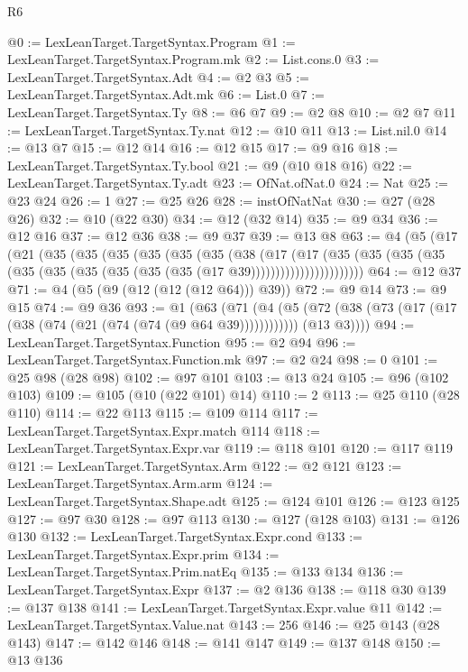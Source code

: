 \begin{lexlean}{R6}
\begin{coremodule}
@0 := LexLeanTarget.TargetSyntax.Program
@1 := LexLeanTarget.TargetSyntax.Program.mk
@2 := List.cons.{0}
@3 := LexLeanTarget.TargetSyntax.Adt
@4 := @2 @3
@5 := LexLeanTarget.TargetSyntax.Adt.mk
@6 := List.{0}
@7 := LexLeanTarget.TargetSyntax.Ty
@8 := @6 @7
@9 := @2 @8
@10 := @2 @7
@11 := LexLeanTarget.TargetSyntax.Ty.nat
@12 := @10 @11
@13 := List.nil.{0}
@14 := @13 @7
@15 := @12 @14
@16 := @12 @15
@17 := @9 @16
@18 := LexLeanTarget.TargetSyntax.Ty.bool
@21 := @9 (@10 @18 @16)
@22 := LexLeanTarget.TargetSyntax.Ty.adt
@23 := OfNat.ofNat.{0}
@24 := Nat
@25 := @23 @24
@26 := 1
@27 := @25 @26
@28 := instOfNatNat
@30 := @27 (@28 @26)
@32 := @10 (@22 @30)
@34 := @12 (@32 @14)
@35 := @9 @34
@36 := @12 @16
@37 := @12 @36
@38 := @9 @37
@39 := @13 @8
@63 := @4
    (@5
      (@17
        (@21
          (@35
            (@35
              (@35
                (@35
                  (@35
                    (@35
                      (@38
                        (@17
                          (@17
                            (@35
                              (@35
                                (@35
                                  (@35 (@35 (@35 (@35 (@35 (@35 (@35 (@17 @39)))))))))))))))))))))))
@64 := @12 @37
@71 := @4 (@5 (@9 (@12 (@12 (@12 @64))) @39))
@72 := @9 @14
@73 := @9 @15
@74 := @9 @36
@93 := @1
    (@63
      (@71
        (@4
          (@5 (@72 (@38 (@73 (@17 (@17 (@38 (@74 (@21 (@74 (@74 (@9 @64 @39))))))))))))
          (@13 @3))))
@94 := LexLeanTarget.TargetSyntax.Function
@95 := @2 @94
@96 := LexLeanTarget.TargetSyntax.Function.mk
@97 := @2 @24
@98 := 0
@101 := @25 @98 (@28 @98)
@102 := @97 @101
@103 := @13 @24
@105 := @96 (@102 @103)
@109 := @105 (@10 (@22 @101) @14)
@110 := 2
@113 := @25 @110 (@28 @110)
@114 := @22 @113
@115 := @109 @114
@117 := LexLeanTarget.TargetSyntax.Expr.match @114
@118 := LexLeanTarget.TargetSyntax.Expr.var
@119 := @118 @101
@120 := @117 @119
@121 := LexLeanTarget.TargetSyntax.Arm
@122 := @2 @121
@123 := LexLeanTarget.TargetSyntax.Arm.arm
@124 := LexLeanTarget.TargetSyntax.Shape.adt
@125 := @124 @101
@126 := @123 @125
@127 := @97 @30
@128 := @97 @113
@130 := @127 (@128 @103)
@131 := @126 @130
@132 := LexLeanTarget.TargetSyntax.Expr.cond
@133 := LexLeanTarget.TargetSyntax.Expr.prim
@134 := LexLeanTarget.TargetSyntax.Prim.natEq
@135 := @133 @134
@136 := LexLeanTarget.TargetSyntax.Expr
@137 := @2 @136
@138 := @118 @30
@139 := @137 @138
@141 := LexLeanTarget.TargetSyntax.Expr.value @11
@142 := LexLeanTarget.TargetSyntax.Value.nat
@143 := 256
@146 := @25 @143 (@28 @143)
@147 := @142 @146
@148 := @141 @147
@149 := @137 @148
@150 := @13 @136

\end{coremodule}
\end{lexlean}
